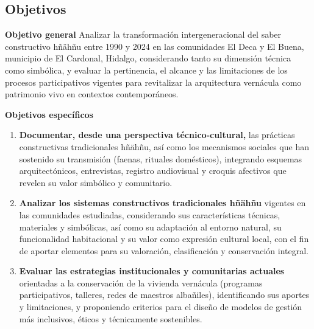 \subsection{Objetivos}

\textbf{Objetivo general}
Analizar la transformación intergeneracional del saber constructivo hñähñu entre 1990 y 2024 en las comunidades El Deca y El Buena, municipio de El Cardonal, Hidalgo, considerando tanto su dimensión técnica como simbólica, y evaluar la pertinencia, el alcance y las limitaciones de los procesos participativos vigentes para revitalizar la arquitectura vernácula como patrimonio vivo en contextos contemporáneos.

\vspace{1em}
\textbf{Objetivos específicos}

\begin{enumerate}
	\item \textbf{Documentar, desde una perspectiva técnico-cultural,} las prácticas constructivas tradicionales hñähñu, así como los mecanismos sociales que han sostenido su transmisión (faenas, rituales domésticos), integrando esquemas arquitectónicos, entrevistas, registro audiovisual y croquis afectivos que revelen su valor simbólico y comunitario. 

	\item \textbf{Analizar los sistemas constructivos tradicionales hñähñu} vigentes en las comunidades estudiadas, considerando sus características técnicas, materiales y simbólicas, así como su adaptación al entorno natural, su funcionalidad habitacional y su valor como expresión cultural local, con el fin de aportar elementos para su valoración, clasificación y conservación integral. 

	\item \textbf{Evaluar las estrategias institucionales y comunitarias actuales} orientadas a la conservación de la vivienda vernácula (programas participativos, talleres, redes de maestros albañiles), identificando sus aportes y limitaciones, y proponiendo criterios para el diseño de modelos de gestión más inclusivos, éticos y técnicamente sostenibles. 
\end{enumerate}

